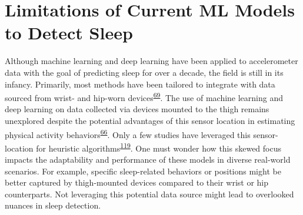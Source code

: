 \documentclass[
  10pt,
]{scrbook}
\begin{document}
\hypertarget{limitations-of-current-ml-models-to-detect-sleep}{%
\section{Limitations of Current ML Models to Detect
Sleep}\label{limitations-of-current-ml-models-to-detect-sleep}}

Although machine learning and deep learning have been applied to
accelerometer data with the goal of predicting sleep for over a decade,
the field is still in its infancy. Primarily, most methods have been
tailored to integrate with data sourced from wrist- and hip-worn
devices\textsuperscript{\protect\hyperlink{ref-conley_agreement_2019}{69}}.
The use of machine learning and deep learning on data collected via
devices mounted to the thigh remains unexplored despite the potential
advantages of this sensor location in estimating physical activity
behaviors\textsuperscript{\protect\hyperlink{ref-bruxf8nd_2020}{66}}.
Only a few studies have leveraged this sensor-location for heuristic
algorithms\textsuperscript{\protect\hyperlink{ref-winkler_identifying_2016}{119}}.
One must wonder how this skewed focus impacts the adaptability and
performance of these models in diverse real-world scenarios. For
example, specific sleep-related behaviors or positions might be better
captured by thigh-mounted devices compared to their wrist or hip
counterparts. Not leveraging this potential data source might lead to
overlooked nuances in sleep detection.
\end{document}
